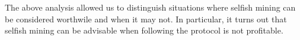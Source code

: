 \noindent The above analysis allowed us to distinguish situations where selfish mining can be considered worthwile and when it may not. In particular, it turns out that selfish mining can be advisable when following the protocol is not profitable. 

